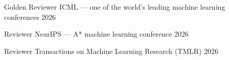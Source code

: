 
\begin{cvhonors}

  \cvhonor
    {Golden Reviewer} %
    {ICML — one of the world's leading machine learning conferences} %
    {} %
    {2026} %

  \cvhonor
    {Reviewer} %
    {NeurIPS — A* machine learning conference} %
    {} %
    {2026} %

  \cvhonor
    {Reviewer} %
    {Transactions on Machine Learning Research (TMLR)} %
    {} %
    {2026} %

\end{cvhonors}

